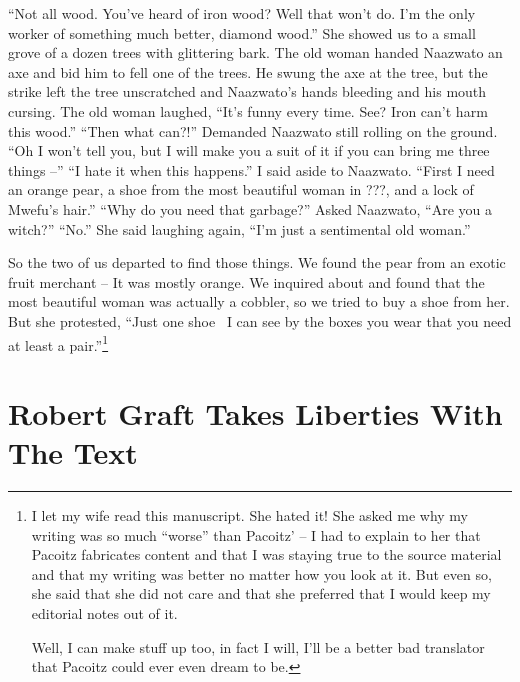 ``Not all wood. You've heard of iron wood? Well that won't do. I'm the only worker of something much better, diamond wood.'' She showed us to a small grove of a dozen trees with glittering bark. The old woman handed Naazwato an axe and bid him to fell one of the trees. He swung the axe at the tree, but the strike left the tree unscratched and Naazwato's hands bleeding and his mouth cursing. The old woman laughed,
``It's funny every time. See? Iron can't harm this wood.'' 
``Then what can?!'' Demanded Naazwato still rolling on the ground.
``Oh I won't tell you, but I will make you a suit of it if you can bring me three things --''
``I hate it when this happens.'' I said aside to Naazwato.
``First I need an orange pear, a shoe from the most beautiful woman in ???, and a lock of Mwefu's hair.''
``Why do you need that garbage?'' Asked Naazwato, ``Are you a witch?''
``No.'' She said laughing again, ``I'm just a sentimental old woman.''

So the two of us departed to find those things. We found the pear from an exotic fruit merchant -- It was mostly orange. We inquired about and found that the most beautiful woman was actually a cobbler, so we tried to buy a shoe from her. But she protested, ``Just one shoe~ I can see by the boxes you wear that you need at least a pair.''\footnote{I let my wife read this manuscript. She hated it!
She asked me why my writing was so much ``worse'' than Pacoitz' -- I had to explain to her that Pacoitz fabricates content and that I was staying true to the source material and that my writing was better no matter how you look at it. But even so, she said that she did not care and that she preferred that I would keep my editorial notes out of it.

Well, I can make stuff up too, in fact I will, I'll be a better bad translator that Pacoitz could ever even dream to be.}

\chapter{Robert Graft Takes Liberties With The Text}
